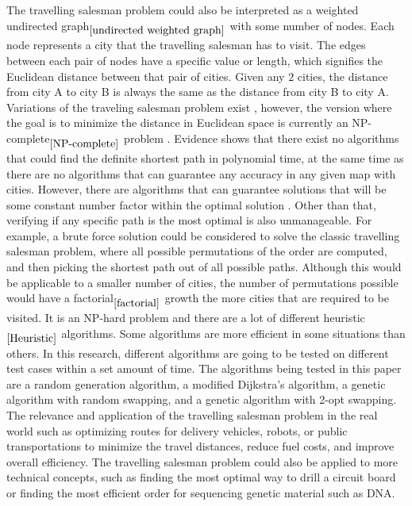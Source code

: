 \documentclass{article}
\begin{document}
\noindent
The travelling salesman problem could also be interpreted as a weighted undirected graph$_{\ref{undirected weighted graph}}$ with some number of nodes. Each node represents a city that the travelling salesman has to visit. The edges between each pair of nodes have a specific value or length, which signifies the Euclidean distance between that pair of cities. Given any $2$ cities, the distance from city A to city B is always the same as the distance from city B to city A.
\newline
Variations of the traveling salesman problem exist \cite{gutin_punnen_2007}, however, the version where the goal is to minimize the distance in Euclidean space is currently an NP-complete$_{\ref{NP-complete}}$ problem \cite{PAPADIMITRIOU1977}. 
\newline
Evidence shows that there exist no algorithms that could find the definite shortest path in polynomial time, at the same time as there are no algorithms that can guarantee any accuracy in any given map with cities. However, there are algorithms that can guarantee solutions that will be some constant number factor within the optimal solution \cite{Christofides}. Other than that, verifying if any specific path is the most optimal is also unmanageable. \cite{PAPADIMITRIOU1977}
\newline
For example, a brute force solution could be considered to solve the classic travelling salesman problem, where all possible permutations of the order are computed, and then picking the shortest path out of all possible paths. Although this would be applicable to a smaller number of cities, the number of permutations possible would have a factorial$_{\ref{factorial}}$ growth the more cities that are required to be visited. 
\newline
It is an NP-hard problem and there are a lot of different heuristic$_{\ref{Heuristic}}$ algorithms. Some algorithms are more efficient in some situations than others. In this research, different algorithms are going to be tested on different test cases within a set amount of time. The algorithms being tested in this paper are a random generation algorithm, a modified Dijkstra's algorithm, a genetic algorithm with random swapping, and a genetic algorithm with 2-opt swapping.
\newline
The relevance and application of the travelling salesman problem in the real world such as optimizing routes for delivery vehicles, robots, or public transportations to minimize the travel distances, reduce fuel costs, and improve overall efficiency. The travelling salesman problem could also be applied to more technical concepts, such as finding the most optimal way to drill a circuit board or finding the most efficient order for sequencing genetic material such as DNA. 
\end{document}
